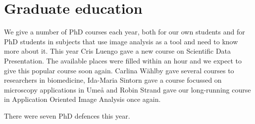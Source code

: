 \section{Graduate education} 

{\large
We give a number of PhD courses each year, both for our own students and for PhD students in subjects that use image analysis as a tool and need to know more about it. This year Cris Luengo gave a new course on Scientific Data Presentation. The available places were filled within an hour and we expect to give this popular course soon again. Carlina W\"{a}hlby gave several courses to researchers in biomedicine, Ida-Maria Sintorn gave a course focussed on microscopy applications in Ume{\aa} and Robin Strand gave our long-running course in Application Oriented Image Analysis once again.

There were seven PhD defences this year. 


%
}
\vspace*{-3mm}
